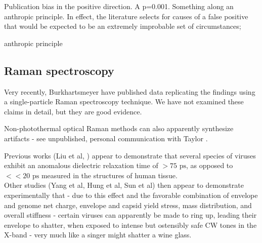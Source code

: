 \documentclass[paper.tex]{subfiles}
\begin{document}
\begin{multicols}{1}

Publication bias in the positive direction. A p=0.001. Something along an anthropic principle. In effect, the literature selects for causes of a false positive that would be expected to be an extremely improbable set of circumstances; 

anthropic principle


\subsection{Raman spectroscopy}

Very recently, Burkhartsmeyer \cite{Optical2020} have published data replicating the findings using a single-particle Raman spectroscopy technique. We have not examined these claims in detail, but they are good evidence.

Non-photothermal optical Raman methods can also apparently synthesize artifacts - see unpublished, personal communication with Taylor \cite{mechanisms1981}. 



























Previous works (Liu et al, ) appear to demonstrate that several species of viruses exhibit an anomalous dielectric relaxation time of $> 75 \text{ ps}$, as opposed to $<< 20 \text{ ps}$ \footnotemark measured in the structures of human tissue.\\

Other studies (Yang et al, Hung et al, Sun et al) then appear to demonstrate experimentally that - due to this effect and the favorable combination of envelope and genome net charge, envelope and capsid yield stress, mass distribution, and overall stiffness - certain viruses can  apparently be made to ring up, leading their envelope to shatter, when exposed to intense but ostensibly safe CW tones in the X-band - very much like a singer might shatter a wine glass.\\


\end{multicols}
\end{document}
